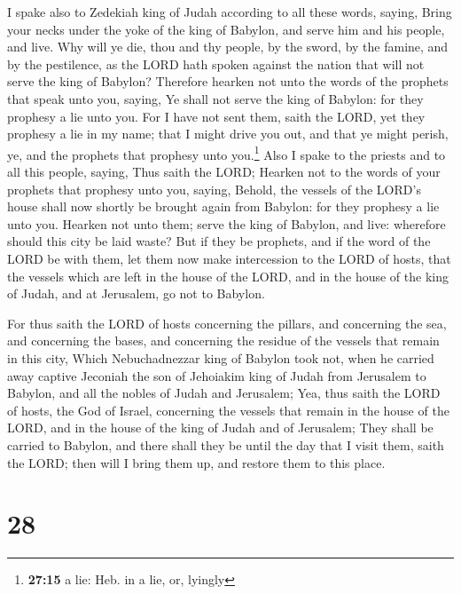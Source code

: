  I spake also to Zedekiah king of Judah according to all
these words, saying, Bring your necks under the yoke of the king of
Babylon, and serve him and his people, and live.  Why
will ye die, thou and thy people, by the sword, by the famine, and by
the pestilence, as the LORD hath spoken against the nation that will not
serve the king of Babylon?  Therefore hearken not unto
the words of the prophets that speak unto you, saying, Ye shall not
serve the king of Babylon: for they prophesy a lie unto you.
 For I have not sent them, saith the LORD, yet they
prophesy a lie in my name; that I might drive you out, and that ye might
perish, ye, and the prophets that prophesy unto you.\footnote{\textbf{27:15}
  a lie: Heb. in a lie, or, lyingly}  Also I spake to the
priests and to all this people, saying, Thus saith the LORD; Hearken not
to the words of your prophets that prophesy unto you, saying, Behold,
the vessels of the LORD's house shall now shortly be brought again from
Babylon: for they prophesy a lie unto you.  Hearken not
unto them; serve the king of Babylon, and live: wherefore should this
city be laid waste?  But if they be prophets, and if the
word of the LORD be with them, let them now make intercession to the
LORD of hosts, that the vessels which are left in the house of the LORD,
and in the house of the king of Judah, and at Jerusalem, go not to
Babylon.

 For thus saith the LORD of hosts concerning the pillars,
and concerning the sea, and concerning the bases, and concerning the
residue of the vessels that remain in this city,  Which
Nebuchadnezzar king of Babylon took not, when he carried away captive
Jeconiah the son of Jehoiakim king of Judah from Jerusalem to Babylon,
and all the nobles of Judah and Jerusalem;  Yea, thus
saith the LORD of hosts, the God of Israel, concerning the vessels that
remain in the house of the LORD, and in the house of the king of Judah
and of Jerusalem;  They shall be carried to Babylon, and
there shall they be until the day that I visit them, saith the LORD;
then will I bring them up, and restore them to this place.

\hypertarget{section-27}{%
\section{28}\label{section-27}}

